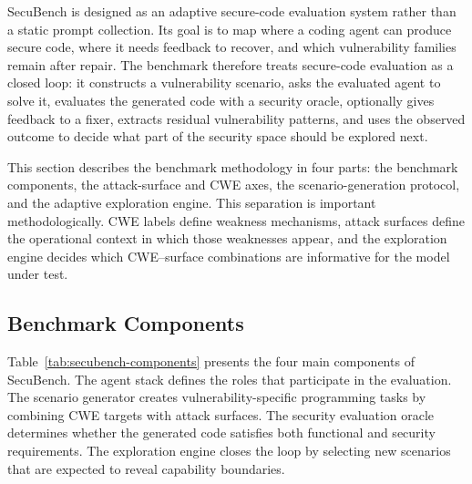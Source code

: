 \documentclass[11pt]{article}
\newcommand{\toolname}{SecuBench}
\begin{document}
\toolname{} is designed as an adaptive secure-code evaluation system rather than a static prompt collection. Its goal is to map where a coding agent can produce secure code, where it needs feedback to recover, and which vulnerability families remain after repair. The benchmark therefore treats secure-code evaluation as a closed loop: it constructs a vulnerability scenario, asks the evaluated agent to solve it, evaluates the generated code with a security oracle, optionally gives feedback to a fixer, extracts residual vulnerability patterns, and uses the observed outcome to decide what part of the security space should be explored next.

This section describes the benchmark methodology in four parts: the benchmark components, the attack-surface and CWE axes, the scenario-generation protocol, and the adaptive exploration engine. This separation is important methodologically. CWE labels define weakness mechanisms, attack surfaces define the operational context in which those weaknesses appear, and the exploration engine decides which CWE--surface combinations are informative for the model under test.

\subsection{Benchmark Components}

Table~\ref{tab:secubench-components} presents the four main components of \toolname{}. The agent stack defines the roles that participate in the evaluation. The scenario generator creates vulnerability-specific programming tasks by combining CWE targets with attack surfaces. The security evaluation oracle determines whether the generated code satisfies both functional and security requirements. The exploration engine closes the loop by selecting new scenarios that are expected to reveal capability boundaries.
\end{document}
